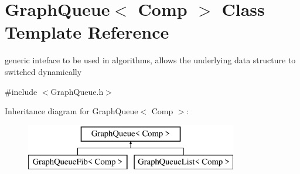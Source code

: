\hypertarget{class_graph_queue}{}\section{Graph\+Queue$<$ Comp $>$ Class Template Reference}
\label{class_graph_queue}


generic inteface to be used in algorithms, allows the underlying data structure to switched dynamically  




{\ttfamily \#include $<$Graph\+Queue.\+h$>$}

Inheritance diagram for Graph\+Queue$<$ Comp $>$\+:\begin{figure}[H]
\begin{center}
\leavevmode
\includegraphics[height=2.000000cm]{class_graph_queue}
\end{center}
\end{figure}
